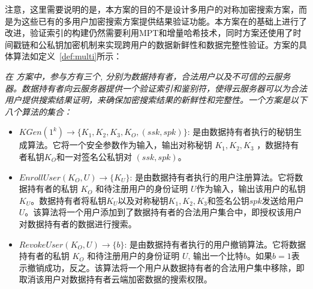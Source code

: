 注意，这里需要说明的是，本方案的目的不是设计多用户的对称加密搜索方案，而是为这些已有的多用户加密搜索方案提供结果验证功能。本方案在\single 的基础上进行了改进，验证索引的构建仍然需要利用MPT和增量哈希技术，同时\multi 方案还使用了时间戳链和公私钥加密机制来实现跨用户的数据新鲜性和数据完整性验证。\multi 方案的具体算法如定义~\ref{def:multi}所示：

\begin{definition}\label{def:multi}
  {\itshape
      在 \multi 方案中，参与方有三个, 分别为数据持有者，合法用户以及不可信的云服务器。数据持有者向云服务器提供一个验证索引和鉴别符，使得云服务器可以为合法用户提供搜索结果证明，来确保加密搜索结果的新鲜性和完整性。一个\multi 方案是以下八个算法的集合：
      \begin{itemize}
        \item $KGen(1^k) \rightarrow \{K_1,K_2,K_3,K_O, (ssk, spk)\}$: 是由数据持有者执行的秘钥生成算法。它将一个安全参数作为输入，输出对称秘钥 $K_1,K_2,K_3$ ，数据持有者私钥$K_O$和一对签名公私钥对 $(ssk, spk)$。
        \item $EnrollUser(K_O,U) \rightarrow \{K_U\}$: 是由数据持有者执行的用户注册算法。它将数据持有者的私钥 $K_O$ 和待注册用户的身份证明 $U$作为输入，输出该用户的私钥$K_U$。数据持有者将私钥$K_U$以及对称秘钥$K_1,K_2,K_3$和签名公钥$spk$发送给用户$U$。该算法将一个用户添加到了数据持有者的合法用户集合中，即授权该用户对数据持有者的数据进行搜索。
        \item $RevokeUser(K_O,U) \rightarrow \{b\}$: 是由数据持有者执行的用户撤销算法。它将数据持有者的私钥 $K_O$ 和待注册用户的身份证明 $U$, 输出一个比特$b$。如果$b=1$表示撤销成功，反之。该算法将一个用户从数据持有者的合法用户集中移除，即取消该用户对数据持有者云端加密数据的搜索权限。


\end{itemize}}
\end{definition}
